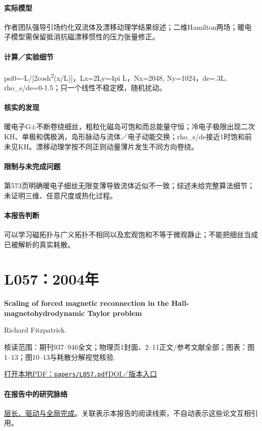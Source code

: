 \paragraph{实际模型}作者团队强导引场约化双流体及漂移动理学结果综述；二维Hamilton两场；暖电子模型需保留抵消抗磁漂移惯性的压力张量修正。

\paragraph{计算／实验细节}psi0=-L/[2cosh\textsuperscript{2}(x/L)]，Lx=2Ly=4pi L，Nx=2048, Ny=1024，de=.3L, rho\_s/de=0-1.5；只一个线性不稳定模，随机扰动。

\paragraph{核实的发现}暖电子G±不断卷绕细丝，粗粒化磁岛可饱和而总能量守恒；冷电子极限出现二次KH、单极和偶极涡，岛形脉动与流体／电子动能交换；rho\_s/de接近1时饱和前未见KH。漂移动理学按不同正则动量薄片发生不同方向卷绕。

\paragraph{限制与未完成问题}第573页明确暖电子细丝无限变薄导致流体近似不一致；综述未给完整算法细节；未证明三维、任意尺度或热化过程。

\paragraph{本报告判断}可以学习磁拓扑与广义拓扑不相同以及宏观饱和不等于微观静止；不能把细丝当成已被解析的真实耗散。

\section{L057：2004年}\label{paper:L057}

\textbf{Scaling of forced magnetic reconnection in the Hall-magnetohydrodynamic Taylor problem}\citep{L057}\

Richard Fitzpatrick.

\textsf{核读范围：}期刊937–946全文；物理页1封面、2–11正文/参考文献全部；\textsf{图表：}图1–13；图10–13与耗散分解视觉核验.

\href{run:papers/L057.pdf}{打开本地PDF：\texttt{papers/L057.pdf}}\quad\href{https://doi.org/10.1063/1.1640378}{DOI／版本入口}

\paragraph{在报告中的研究脉络}\hyperref[story:global]{层长、驱动与全局完成}。关联表示本报告的阅读线索，不自动表示这些论文互相引用。

